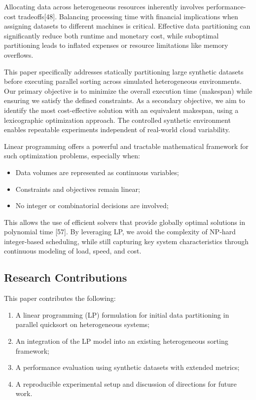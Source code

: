 \documentclass[]{interact}
\theoremstyle{plain}
\theoremstyle{definition}
\theoremstyle{remark}
\begin{document}
Allocating data across heterogeneous resources inherently involves performance-cost tradeoffs[48]. Balancing processing time with financial implications when assigning datasets to different machines is critical. Effective data partitioning can significantly reduce both runtime and monetary cost, while suboptimal partitioning leads to inflated expenses or resource limitations like memory overflows. 

This paper specifically addresses statically partitioning large synthetic datasets before executing parallel sorting across simulated heterogeneous environments. Our primary objective is to minimize the overall execution time (makespan) while ensuring we satisfy the defined constraints. As a secondary objective, we aim to identify the most cost-effective solution with an equivalent makespan, using a lexicographic optimization approach. The controlled synthetic environment enables repeatable experiments independent of real-world cloud variability.

Linear programming offers a powerful and tractable mathematical framework for such optimization problems, especially when:
\begin{itemize}
    \item Data volumes are represented as continuous variables;
    \item Constraints and objectives remain linear;
    \item No integer or combinatorial decisions are involved;
\end{itemize}
This allows the use of efficient solvers that provide globally optimal solutions in polynomial time [57]. By leveraging LP, we avoid the complexity of NP-hard integer-based scheduling, while still capturing key system characteristics through continuous modeling of load, speed, and cost.

\subsection{Research Contributions}

This paper contributes the following:
\begin{enumerate}
    \item A linear programming (LP) formulation for initial data partitioning in parallel quicksort on heterogeneous systems;
    \item An integration of the LP model into an existing heterogeneous sorting framework;
    \item A performance evaluation using synthetic datasets with extended metrics;
    \item A reproducible experimental setup and discussion of directions for future work.
\end{enumerate}
\end{document}
